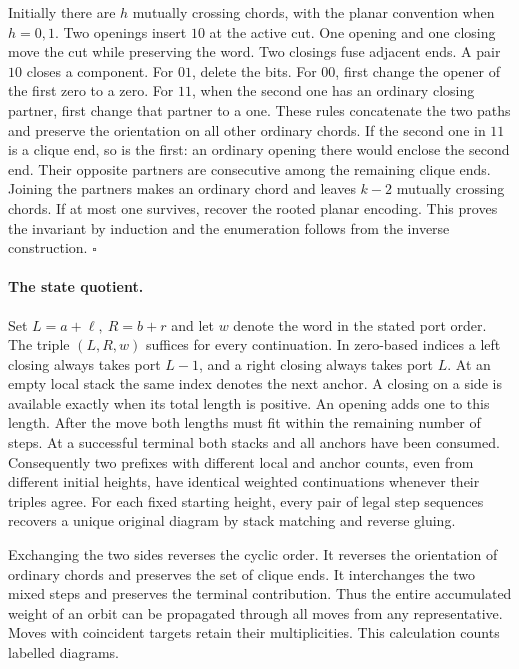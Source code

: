 Initially there are \(h\) mutually crossing chords, with the planar
convention when \(h=0,1\). Two openings insert \(10\) at the active cut.
One opening and one closing move the cut while preserving the word. Two
closings fuse adjacent ends. A pair \(10\) closes a component. For \(01\),
delete the bits. For \(00\), first change the opener of the first zero to a
zero. For \(11\), when the second one has an ordinary closing partner,
first change that partner to a one. These rules concatenate the two paths
and preserve the orientation on all other ordinary chords.
If the second one in \(11\) is a clique end, so is the first: an ordinary
opening there would enclose the second end. Their opposite partners are
consecutive among the remaining clique ends. Joining the partners makes an
ordinary chord and leaves \(k-2\) mutually crossing chords. If at most one
survives, recover the rooted planar encoding. This proves the invariant by
induction and the enumeration follows from the inverse construction.
\hfill\(\square\)

\paragraph{The state quotient.}
Set \(L=a+\ell,\ R=b+r\) and let \(w\) denote the word in the stated port
order. The triple \((L,R,w)\) suffices for every continuation. In zero-based
indices a left closing always takes port \(L-1\), and a right closing always
takes port \(L\). At an empty local stack the same index denotes the next
anchor. A closing on a side is available exactly when its total length is
positive. An opening adds one to this length. After the move both lengths
must fit within the remaining number of steps. At a successful terminal
both stacks and all anchors have been consumed. Consequently two prefixes
with different local and anchor counts, even from different initial
heights, have identical weighted continuations whenever their triples
agree. For each fixed starting height, every pair of legal step sequences
recovers a unique original diagram by stack matching and reverse gluing.

Exchanging the two sides reverses the cyclic order. It reverses the
orientation of ordinary chords and preserves the set of clique ends. It
interchanges the two mixed steps and preserves the terminal contribution.
Thus the entire accumulated weight of an orbit can be propagated through
all moves from any representative. Moves with coincident targets retain
their multiplicities. This calculation counts labelled diagrams.

